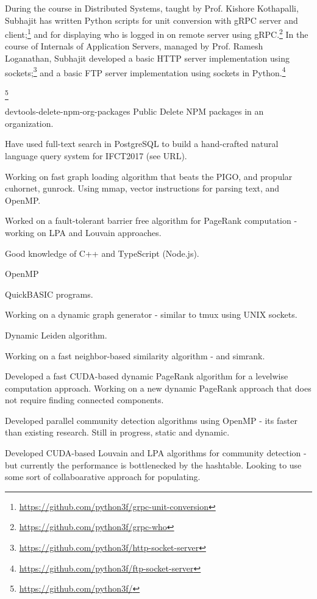 

During the course in Distributed Systems, taught by Prof. Kishore Kothapalli, Subhajit has written Python scripts for unit conversion with gRPC server and client;\footnote{\url{https://github.com/python3f/grpc-unit-conversion}} and for displaying who is logged in on remote server using gRPC.\footnote{\url{https://github.com/python3f/grpc-who}} In the course of Internals of Application Servers, managed by Prof. Ramesh Loganathan, Subhajit developed a basic HTTP server implementation using sockets;\footnote{\url{https://github.com/python3f/http-socket-server}} and a basic FTP server implementation using sockets in Python.\footnote{\url{https://github.com/python3f/ftp-socket-server}}






\footnote{\url{https://github.com/python3f/}}

devtools-delete-npm-org-packages Public
Delete NPM packages in an organization.



Have used full-text search in PostgreSQL to build a hand-crafted natural language query system for IFCT2017 (see URL).

Working on fast graph loading algorithm that beats the PIGO, and propular cuhornet, gunrock. Using mmap, vector instructions for parsing text, and OpenMP.

Worked on a fault-tolerant barrier free algorithm for PageRank computation - working on LPA and Louvain approaches.

Good knowledge of C++ and TypeScript (Node.js).

OpenMP

QuickBASIC programs.

Working on a dynamic graph generator - similar to tmux using UNIX sockets.

Dynamic Leiden algorithm.

Working on a fast neighbor-based similarity algorithm - and simrank.

Developed a fast CUDA-based dynamic PageRank algorithm for a levelwise computation approach. Working on a new dynamic PageRank approach that does not require finding connected components.

Developed parallel community detection algorithms using OpenMP - its faster than existing research. Still in progress, static and dynamic.

Developed CUDA-based Louvain and LPA algorithms for community detection - but currently the performance is bottlenecked by the hashtable. Looking to use some sort of collaboarative approach for populating.


